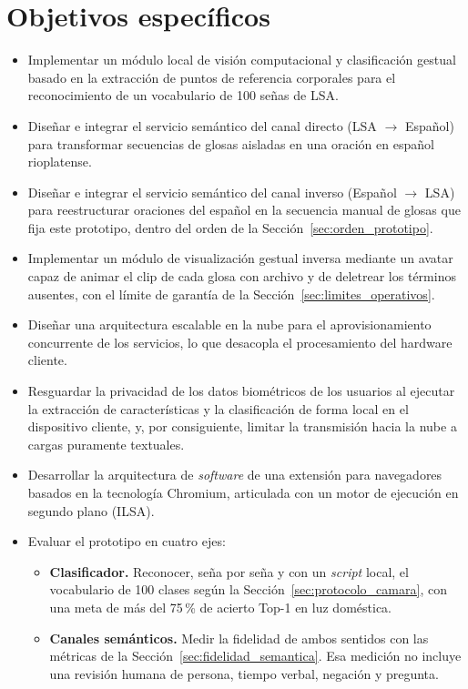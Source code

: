 \section{Objetivos específicos}
\begin{itemize}
    \item Implementar un módulo local de visión computacional y clasificación gestual basado en la extracción de puntos de referencia corporales para el reconocimiento de un vocabulario de 100 señas de LSA.
    \item Diseñar e integrar el servicio semántico del canal directo (LSA $\rightarrow$ Español) para transformar secuencias de glosas aisladas en una oración en español rioplatense. 
    \item Diseñar e integrar el servicio semántico del canal inverso (Español $\rightarrow$ LSA) para reestructurar oraciones del español en la secuencia manual de glosas que fija este prototipo, dentro del orden de la Sección~\ref{sec:orden_prototipo}.
    \item Implementar un módulo de visualización gestual inversa mediante un avatar capaz de animar el clip de cada glosa con archivo y de deletrear los términos ausentes, con el límite de garantía de la Sección~\ref{sec:limites_operativos}.
    \item Diseñar una arquitectura escalable en la nube para el aprovisionamiento concurrente de los servicios, lo que desacopla el procesamiento del hardware cliente.
    \item Resguardar la privacidad de los datos biométricos de los usuarios al ejecutar la extracción de características y la clasificación de forma local en el dispositivo cliente, y, por consiguiente, limitar la transmisión hacia la nube a cargas puramente textuales.
    \item Desarrollar la arquitectura de \textit{software} de una extensión para navegadores basados en la tecnología Chromium, articulada con un motor de ejecución en segundo plano (ILSA).
   \item Evaluar el prototipo en cuatro ejes:
    \begin{itemize}
        \item \textbf{Clasificador.} Reconocer, seña por seña y con un \textit{script} local, el vocabulario de 100 clases según la Sección~\ref{sec:protocolo_camara}, con una meta de más del 75\,\% de acierto Top-1 en luz doméstica.
        \item \textbf{Canales semánticos.} Medir la fidelidad de ambos sentidos con las métricas de la Sección~\ref{sec:fidelidad_semantica}. Esa medición no incluye una revisión humana de persona, tiempo verbal, negación y pregunta.

\end{itemize}
\end{itemize}
